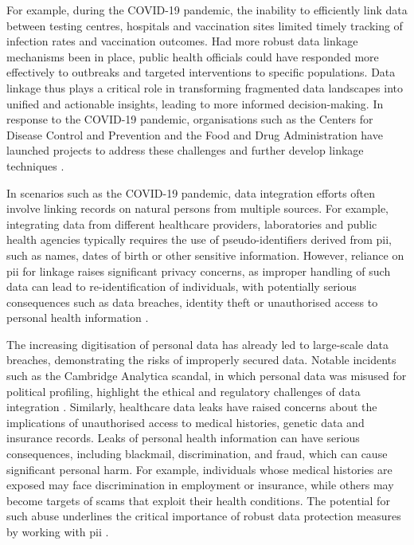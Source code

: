 For example, during the COVID-19 pandemic, the inability to efficiently link data between testing centres, hospitals and vaccination sites limited timely tracking of infection rates and vaccination outcomes. 
Had more robust data linkage mechanisms been in place, public health officials could have responded more effectively to outbreaks and targeted interventions to specific populations. 
Data linkage thus plays a critical role in transforming fragmented data landscapes into unified and actionable insights, leading to more informed decision-making.
In response to the COVID-19 pandemic, organisations such as the Centers for Disease Control and Prevention and the Food and Drug Administration have launched projects to address these challenges and further develop linkage techniques \cite{pathak2024privacy}.

In scenarios such as the COVID-19 pandemic, data integration efforts often involve linking records on natural persons from multiple sources.
For example, integrating data from different healthcare providers, laboratories and public health agencies typically requires the use of pseudo-identifiers derived from \ac{pii}, such as names, dates of birth or other sensitive information. 
However, reliance on \ac{pii} for linkage raises significant privacy concerns, as improper handling of such data can lead to re-identification of individuals, with potentially serious consequences such as data breaches, identity theft or unauthorised access to personal health information \cite{pathak2024privacy, schnell2009privacy}.

The increasing digitisation of personal data has already led to large-scale data breaches, demonstrating the risks of improperly secured data. 
Notable incidents such as the Cambridge Analytica scandal, in which personal data was misused for political profiling, highlight the ethical and regulatory challenges of data integration \cite{isaak2018user}. 
Similarly, healthcare data leaks have raised concerns about the implications of unauthorised access to medical histories, genetic data and insurance records.
Leaks of personal health information can have serious consequences, including blackmail, discrimination, and fraud, which can cause significant personal harm. 
For example, individuals whose medical histories are exposed may face discrimination in employment or insurance, while others may become targets of scams that exploit their health conditions. 
The potential for such abuse underlines the critical importance of robust data protection measures by working with \ac{pii} \cite{smith2016examining}.


